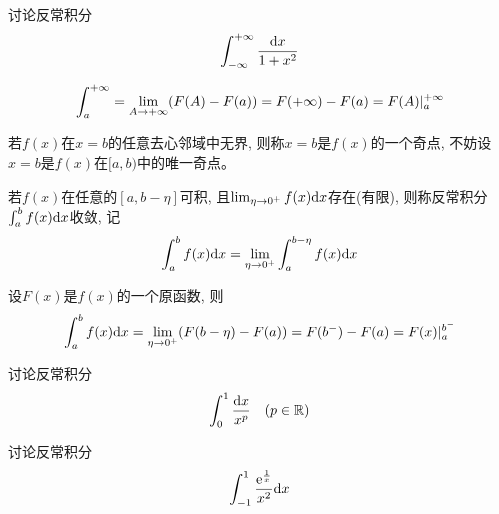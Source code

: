 \begin{example}
    讨论反常积分
    \begin{equation*}
        \int_{-\infty}^{+\infty}\frac{\mathrm{d} x}{1+x^2}
    \end{equation*}
\end{example}
\begin{solution}
    
\end{solution}
\begin{remark}
    \begin{equation*}
        \int_a^{+\infty} = \lim_{A \to +\infty } (F(A) - F(a)) = F(+\infty) - F(a) = F(A)|_a^{+\infty}
    \end{equation*}
\end{remark}

\begin{definition}
    若$f(x)$在$x = b$的任意去心邻域中无界, 则称$x = b$是$f(x)$的一个奇点, 不妨设$x = b$是$f(x)$在$[a, b)$中的唯一奇点。

    若$f(x)$在任意的$[a, b-\eta]$可积, 且$\lim_{\eta \to 0^+ } f(x) \mathrm{d} x$存在(有限), 则称反常积分$\int_a^b f(x) \mathrm{d} x$收敛, 记
    \begin{equation*}
        \int_a^b f(x) \mathrm{d} x = \lim_{\eta \to 0^+ } \int_a^{b-\eta} f(x) \mathrm{d} x
    \end{equation*}

    设$F(x)$是$f(x)$的一个原函数, 则
    \begin{equation*}
        \int_a^b f(x) \mathrm{d} x = \lim_{\eta \to 0^+ } (F(b-\eta) - F(a)) = F(b^-) - F(a) = F(x)|_a^{b^-}
    \end{equation*}
\end{definition}

\begin{example}[P-积分]
    讨论反常积分
    \begin{equation*}
        \int_0^1\frac{\mathrm{d} x}{x^p} \quad (p \in \mathbb{R})
    \end{equation*}
\end{example}
\begin{solution}
    
\end{solution}

\begin{example}
    讨论反常积分
    \begin{equation*}
        \int_{-1}^1 \frac{\mathrm{e}^{\frac{1}{x}}}{x^2} \mathrm{d} x
    \end{equation*}
\end{example}

